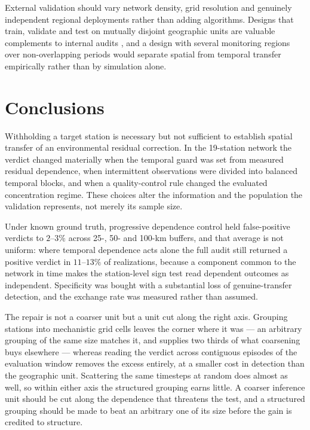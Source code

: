 External validation should vary network density, grid resolution and genuinely independent regional
deployments rather than adding algorithms. Designs that train, validate and test on mutually
disjoint geographic units are valuable complements to internal audits \citep{patane2025}, and a
design with several monitoring regions over non-overlapping periods would separate spatial from
temporal transfer empirically rather than by simulation alone.


\section{Conclusions}

Withholding a target station is necessary but not sufficient to establish spatial transfer of an
environmental residual correction. In the 19-station \pmten{} network the verdict changed
materially when the temporal guard was set from measured residual dependence, when intermittent
observations were divided into balanced temporal blocks, and when a quality-control rule changed
the evaluated concentration regime. These choices alter the information and the population the
validation represents, not merely its sample size.

Under known ground truth, progressive dependence control held false-positive verdicts to
$2$--$3\%$ across 25-, 50- and 100-km buffers, and that average is not uniform: where temporal
dependence acts alone the full audit still returned a positive verdict in $11$--$13\%$ of
realizations, because a component common to the network in time makes the station-level sign test
read dependent outcomes as independent. Specificity was bought with a substantial loss of
genuine-transfer detection, and the exchange rate was measured rather than assumed.

The repair is not a coarser unit but a unit cut along the right axis. Grouping stations into
mechanistic grid cells leaves the corner where it was --- an arbitrary grouping of the same size
matches it, and supplies two thirds of what coarsening buys elsewhere --- whereas reading the
verdict across contiguous episodes of the evaluation window removes the excess entirely, at a
smaller cost in detection than the geographic unit. Scattering the same timesteps at random does
almost as well, so within either axis the structured grouping earns little. A coarser inference
unit should be cut along the dependence that threatens the test, and a structured grouping should
be made to beat an arbitrary one of its size before the gain is credited to structure.
